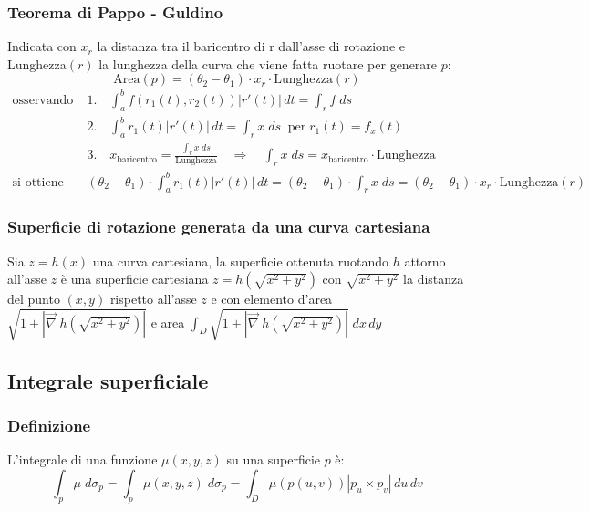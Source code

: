 \documentclass[a4paper]{article}
\newcommand\nab{\vec{\nabla}} %
\begin{document}
\subsubsection*{Teorema di Pappo - Guldino}
Indicata con \(x_r\) la distanza tra il baricentro di r dall'asse di rotazione e Lunghezza\((r)\) la lunghezza della curva che viene
fatta ruotare per generare \(p\):
\[\text{Area}(p) = (\theta_2 - \theta_1) \cdot x_r \cdot \text{Lunghezza}(r)\]
\begin{align*}
	\text{osservando che} \; &1. \quad \int_a^b f(r_1(t),r_2(t)) \left|r'(t)\right| \, dt = \int_r f \; ds \\
	&2. \quad \int_a^b r_1(t) \left|r'(t)\right| \, dt = \int_r x \; ds \;\; \text{per} \; r_1(t) = f_x(t) \\
	&3. \quad x_\text{baricentro} = \frac{\int_r x \; ds}{\text{Lunghezza}} \quad \Rightarrow \quad \int_r x \; ds = x_\text{baricentro} \cdot \text{Lunghezza} \\
	\text{si ottiene che} \; &(\theta_2 - \theta_1) \cdot \int_a^b r_1(t) \left|r'(t)\right| \, dt = (\theta_2 - \theta_1) \cdot \int_r x \; ds = (\theta_2 - \theta_1) \cdot x_r \cdot \text{Lunghezza}(r)
\end{align*}

\subsubsection*{Superficie di rotazione generata da una curva cartesiana}
Sia \(z = h(x)\) una curva cartesiana, la superficie ottenuta ruotando \(h\) attorno all'asse \(z\) è una superficie cartesiana \(z = h(\sqrt{x^2+y^2})\)
con \(\sqrt{x^2+y^2}\) la distanza del punto \((x,y)\) rispetto all'asse \(z\) e con elemento d'area \(\sqrt{ 1 + \left| \nab \; h \left(\sqrt{x^2 + y^2}\right)\right|}\)
e area \(\displaystyle \int_D \sqrt{ 1 + \left| \nab \; h \left(\sqrt{x^2 + y^2}\right)\right|} \; dx \, dy\)

\subsection{Integrale superficiale}
\subsubsection*{Definizione}
L'integrale di una funzione \(\mu(x,y,z)\) su una superficie \(p\) è:
\[\int_p \mu \; d\sigma_p = \int_p \mu(x,y,z) \; d\sigma_p= \int_D \mu(p(u,v)) \left|p_u \times p_v\right| \, du \, dv\]
\end{document}
